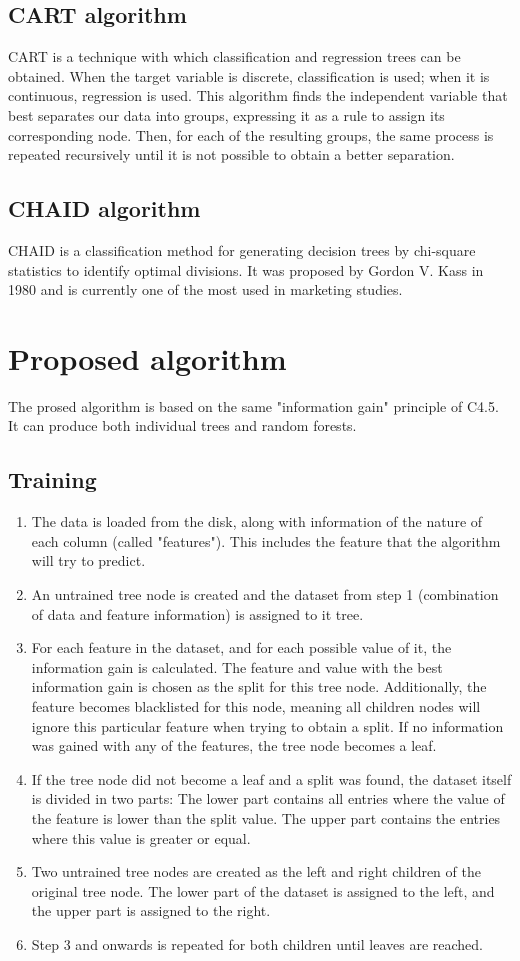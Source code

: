 \documentclass{acm_proc_article-sp}
\begin{document}
\subsection{CART algorithm}
CART is a technique with which classification and regression trees can be obtained. When the target variable is discrete, classification is used; when it is continuous, regression is used. This algorithm finds the independent variable that best separates our data into groups, expressing it as a rule to assign its corresponding node. Then, for each of the resulting groups, the same process is repeated recursively until it is not possible to obtain a better separation.

\subsection{CHAID algorithm}
CHAID is a classification method for generating decision trees by chi-square statistics to identify optimal divisions. It was proposed by Gordon V. Kass in 1980 and is currently one of the most used in marketing studies.

\section{Proposed algorithm}
The prosed algorithm is based on the same "information gain" principle of C4.5. It can produce both individual trees and random forests.
\subsection{Training}
\begin{enumerate}
  \item The data is loaded from the disk, along with information of the nature of each column (called "features"). This includes the feature that the algorithm will try to predict.
  \item An untrained tree node is created and the dataset from step 1 (combination of data and feature information) is assigned to it tree.
  \item For each feature in the dataset, and for each possible value of it, the information gain is calculated. The feature and value with the best information gain is chosen as the split for this tree node. Additionally, the feature becomes blacklisted for this node, meaning all children nodes will ignore this particular feature when trying to obtain a split. If no information was gained with any of the features, the tree node becomes a leaf.
  \item If the tree node did not become a leaf and a split was found, the dataset itself is divided in two parts: The lower part contains all entries where the value of the feature is lower than the split value. The upper part contains the entries where this value is greater or equal.
  \item Two untrained tree nodes are created as the left and right children of the original tree node. The lower part of the dataset is assigned to the left, and the upper part is assigned to the right.
  \item Step 3 and onwards is repeated for both children until leaves are reached.
\end{enumerate}
\end{document}

